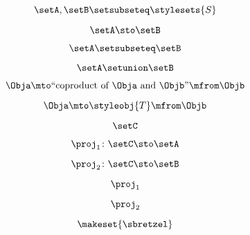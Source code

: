\begin{forslides}
    \begin{equation}
        \label{eq:systems-145}
        \setA,\setB\setsubseteq \stylesets{S}
    \end{equation}

    \begin{equation}
        \label{eq:systems-146}
        \setA \sto \setB
    \end{equation}

    \begin{equation}
        \label{eq:systems-147}
        \setA\setsubseteq \setB
    \end{equation}

    \begin{equation}
        \label{eq:systems-148}
        \setA\setunion\setB
    \end{equation}

    \begin{equation}
        \label{eq:systems-149}
        \Obja \mto \text{``coproduct of } \Obja \text{ and } \Objb \text{''}  \mfrom \Objb
    \end{equation}

    \begin{equation}
        \label{eq:systems-150}
        \Obja \mto \styleobj{T} \mfrom \Objb
    \end{equation}

    \begin{equation}
        \label{eq:systems-151}
        \setC
    \end{equation}

    \begin{equation}
        \label{eq:systems-152}
        \proj_1\colon \setC \sto \setA
    \end{equation}

    \begin{equation}
        \label{eq:systems-153}
        \proj_2\colon \setC \sto \setB
    \end{equation}

    \begin{equation}
        \label{eq:systems-154}
        \proj_1
    \end{equation}

    \begin{equation}
        \label{eq:systems-155}
        \proj_2
    \end{equation}

    \begin{equation}
        \label{eq:systems-156}
        \makeset{ \sbretzel }
    \end{equation}


\end{forslides}
